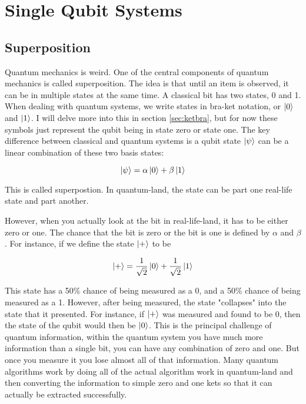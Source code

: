 \documentclass{textbook}
\begin{document}
\section{Single Qubit Systems}

\subsection{Superposition}
Quantum mechanics is weird. One of the central components of quantum mechanics is called superposition. The idea is that until an item is observed, it can be in multiple states at the same time. A classical bit has two states, 0 and 1. When dealing with quantum systems, we write states in bra-ket notation, or $\ket{0}$ and $\ket{1}$. I will delve more into this in section \ref{sec:ketbra}, but for now these symbols just represent the qubit being in state zero or state one. The key difference between classical and quantum systems is a qubit state $\ket{\psi}$ can be a linear combination of these two basis states:

\begin{equation}
  \ket{\psi} = \alpha \ket{0} + \beta \ket{1}
\end{equation}

This is called superpostion. In quantum-land, the state can be part one real-life state and part another. 

However, when you actually look at the bit in real-life-land, it has to be either zero or one. The chance that the bit is zero or the bit is one is defined by $\alpha$ and $\beta$. For instance, if we define the state $\ket{+}$ to be

\begin{equation}
    \ket{+} = \frac{1}{\sqrt{2}} \ket{0} + \frac{1}{\sqrt{2}}\ket{1}
\end{equation}

This state has a 50\% chance of being measured as a 0, and a 50\% chance of being measured as a 1. However, after being measured, the state "collapses" into the state that it presented. For instance, if $\ket{+}$ was measured and found to be 0, then the state of the qubit would then be $\ket{0}$. This is the principal challenge of quantum information, within the quantum system you have much more information than a single bit, you can have any combination of zero and one. But once you measure it you lose almost all of that information. Many quantum algorithms work by doing all of the actual algorithm work in quantum-land and then converting the information to simple zero and one kets so that it can actually be extracted successfully. 
\end{document}
